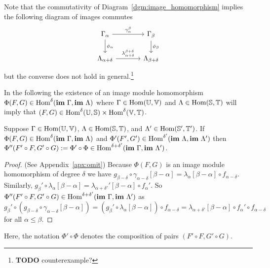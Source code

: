 Note that the commutativity of Diagram~\ref{dgm:image_homomorphism} implies the following diagram of images commutes
\begin{equation}\label{dgm:shifted_homomorphism}
  \begin{tikzcd}[column sep=large]
    \Gamma_\alpha\arrow{r}{\gamma_\alpha^\beta}\arrow{d}{\phi_\alpha} &
    \Gamma_\beta\arrow{d}{\phi_\beta}\\
    \Lambda_{\alpha+\delta}\arrow{r}{\lambda_{\alpha+\delta}^{\beta+\delta}} &
    \Lambda_{\beta +\delta}
\end{tikzcd}\end{equation}
but the converse does not hold in general.\footnote{\textbf{TODO} counterexample?}

In the following the existence of an image module homomorphism $\Phi(F, G)\in\mathrm{Hom}^\delta(\mathbf{im}~\Gamma, \mathbf{im}~\Lambda)$ where $\Gamma\in\mathrm{Hom}(\mathbb{U},\mathbb{V})$ and $\Lambda\in\mathrm{Hom}(\mathbb{S},\mathbb{T})$  will imply that $(F,G)\in\mathrm{Hom}^\delta(\mathbb{U},\mathbb{S})\times \mathrm{Hom}^\delta(\mathbb{V},\mathbb{T})$.


\begin{lemma}\label{lem:image_composition}
  Suppose $\Gamma\in\mathrm{Hom}(\mathbb{U},\mathbb{V})$, $\Lambda\in\mathrm{Hom}(\mathbb{S},\mathbb{T})$, and $\Lambda'\in\mathrm{Hom}(\mathbb{S}',\mathbb{T}')$.
  If $\Phi(F, G)\in\mathrm{Hom}^\delta(\mathbf{im}~\Gamma, \mathbf{im}~\Lambda)$ and $\Phi'(F', G')\in\mathrm{Hom}^{\delta'}(\mathbf{im}~\Lambda, \mathbf{im}~\Lambda')$ then $\Phi''(F'\circ F, G'\circ G) := \Phi'\circ\Phi\in\mathrm{Hom}^{\delta+\delta'}(\mathbf{im}~\Gamma,\mathbf{im}~\Lambda')$.
\end{lemma}
\begin{proof}
(See Appendix~\ref{apx:omit})\proofatend
  Because $\Phi(F, G)$ is an image module homomorphism of degree $\delta$ we have $g_{\beta-\delta}\circ\gamma_{\alpha-\delta}[\beta-\alpha] = \lambda_\alpha[\beta-\alpha]\circ f_{\alpha-\delta}$.
  Similarly, $g_{\beta}'\circ\lambda_{\alpha}[\beta-\alpha] = \lambda_{\alpha +\delta'}'[\beta-\alpha]\circ f_{\alpha}'$.
  So $\Phi''(F'\circ F, G'\circ G)\in\mathrm{Hom}^{\delta+\delta'}(\mathbf{im}~\Gamma,\mathbf{im}~\Lambda')$ as
  \[ g_\beta'\circ (g_{\beta-\delta}\circ \gamma_{\alpha-\delta}[\beta-\alpha]) = (g_\beta'\circ \lambda_\alpha[\beta-\alpha])\circ f_{\alpha-\delta} =\lambda_{\alpha+\delta'}[\beta-\alpha]\circ f_\alpha'\circ f_{\alpha-\delta}\]
  for all $\alpha\leq\beta$.
\endproofatend
\end{proof}

Here, the notation $\Phi'\circ \Phi$ denotes the composition of pairs $(F'\circ F, G'\circ G)$.

